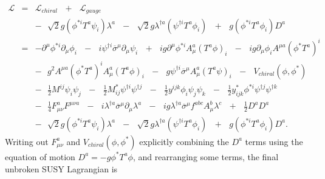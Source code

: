 \documentclass[dissertation.tex]{subfiles}
\begin{document}
\begin{eqnarray}
\label{eq:L_full}
\mathcal{L} &=& \mathcal{L}_{chiral}\mbox{ }+\mbox{ }\mathcal{L}_{gauge}\mbox{ }\nonumber \\
&&-\mbox{ }\sqrt{2}g(\phi^{*i}T^{a}\psi_{i})\lambda^{a}\mbox{ }-\mbox{ }\sqrt{2}g\lambda^{\dag a}(\psi^{\dag i}T^{a}\phi_{i})\mbox{ }+\mbox{ }g(\phi^{*i}T^{a}\phi_{i})D^{a}\nonumber \\
&=&-\partial^{\mu}\phi^{*i}\partial_{\mu}\phi_{i}\mbox{ }-\mbox{ }i\psi^{\dag i}\overline{\sigma}^{\mu}\partial_{\mu}\psi_{i}\mbox{ }+\mbox{ }ig\partial^{\mu}\phi^{*i}A_{\mu}^{a}(T^{a}\phi)_{i}\mbox{ }-\mbox{ }ig\partial_{\mu}\phi_{i}A^{\mu a}(\phi^{*}T^{a})^{i}\mbox{ }\nonumber \\
&&-\mbox{ }g^{2}A^{\mu a}(\phi^{*}T^{a})^{i}A_{\mu}^{a}(T^{a}\phi)_{i}\mbox{ }-\mbox{ }g\psi^{\dag i}\overline{\sigma}^{\mu}A_{\mu}^{a}(T^{a}\psi)_{i}\mbox{ }-\mbox{ }V_{chiral}(\phi, \phi^{*})\mbox{ }\nonumber \\
&&-\mbox{ }\frac{1}{2}M^{ij}\psi_{i}\psi_{j}\mbox{ }-\mbox{ }\frac{1}{2}M_{ij}^{*}\psi^{\dag i}\psi^{\dag j}\mbox{ }-\mbox{ }\frac{1}{2}y^{ijk}\phi_{i}\psi_{j}\psi_{k}\mbox{ }-\mbox{ }\frac{1}{2}y_{ijk}^{*}\phi^{*i}\psi^{\dag j}\psi^{\dag k}\mbox{ }\nonumber \\
&&-\mbox{ }\frac{1}{4}F_{\mu\nu}^{a}F^{\mu\nu a}\mbox{ }-\mbox{ }i\lambda^{\dag a}\overline{\sigma}^{\mu}\partial_{\mu}\lambda^{a}\mbox{ }-\mbox{ }ig\lambda^{\dag a}\overline{\sigma}^{\mu}f^{abc}A_{\mu}^{b}\lambda^{c}\mbox{ }+\mbox{ }\frac{1}{2}D^{a}D^{a}\mbox{ }\nonumber \\
&&-\mbox{ }\sqrt{2}g(\phi^{*i}T^{a}\psi_{i})\lambda^{a}\mbox{ }-\mbox{ }\sqrt{2}g\lambda^{\dag a}(\psi^{\dag i}T^{a}\phi_{i})\mbox{ }+\mbox{ }g(\phi^{*i}T^{a}\phi_{i})D^{a}.
\end{eqnarray}
%
Writing out $F_{\mu\nu}^{a}$ and $V_{chiral}(\phi, \phi^{*})$ explicitly combining the $D^{a}$ terms using the equation of motion $D^{a} = -g\phi^{*}T^{a}\phi$, and rearranging some terms, the final unbroken SUSY Lagrangian is
\end{document}
